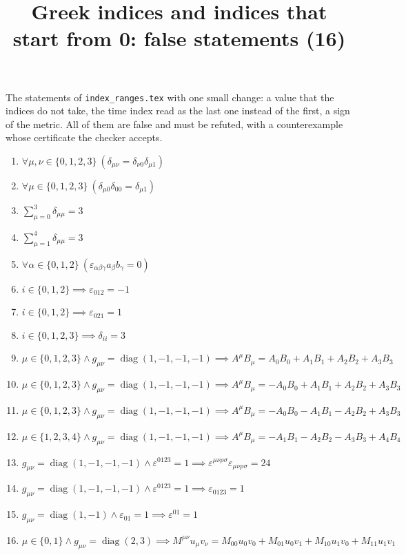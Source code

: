 \documentclass[11pt,a4paper]{article}
\title{Greek indices and indices that start from 0: false statements (16)}
\author{}
\date{}
\begin{document}
\maketitle
The statements of \texttt{index\_ranges.tex} with one small change: a value that the indices do not take, the time index read as the last one instead of the first, a sign of the metric. All of them are false and must be refuted, with a counterexample whose certificate the checker accepts.

\begin{enumerate}
\item $\displaystyle \forall \mu, \nu \in \{0, 1, 2, 3\}\ \left( \delta_{\mu\nu} = \delta_{\nu 0}\delta_{\mu 1} \right)$
\item $\displaystyle \forall \mu \in \{0, 1, 2, 3\}\ \left( \delta_{\mu 0}\delta_{00} = \delta_{\mu 1} \right)$
\item $\displaystyle \sum_{\mu=0}^{3} \delta_{\mu\mu} = 3$
\item $\displaystyle \sum_{\mu=1}^{4} \delta_{\mu\mu} = 3$
\item $\displaystyle \forall \alpha \in \{0, 1, 2\}\ \left( \varepsilon_{\alpha\beta\gamma} a_{\beta} b_{\gamma} = 0 \right)$
\item $\displaystyle i \in \{0, 1, 2\} \implies \varepsilon_{012} = -1$
\item $\displaystyle i \in \{0, 1, 2\} \implies \varepsilon_{021} = 1$
\item $\displaystyle i \in \{0, 1, 2, 3\} \implies \delta_{ii} = 3$
\item $\displaystyle \mu \in \{0, 1, 2, 3\} \land g_{\mu\nu} = \operatorname{diag}(1, -1, -1, -1) \implies A^{\mu} B_{\mu} = A_{0} B_{0} + A_{1} B_{1} + A_{2} B_{2} + A_{3} B_{3}$
\item $\displaystyle \mu \in \{0, 1, 2, 3\} \land g_{\mu\nu} = \operatorname{diag}(1, -1, -1, -1) \implies A^{\mu} B_{\mu} = -A_{0} B_{0} + A_{1} B_{1} + A_{2} B_{2} + A_{3} B_{3}$
\item $\displaystyle \mu \in \{0, 1, 2, 3\} \land g_{\mu\nu} = \operatorname{diag}(1, -1, -1, -1) \implies A^{\mu} B_{\mu} = -A_{0} B_{0} - A_{1} B_{1} - A_{2} B_{2} + A_{3} B_{3}$
\item $\displaystyle \mu \in \{1, 2, 3, 4\} \land g_{\mu\nu} = \operatorname{diag}(1, -1, -1, -1) \implies A^{\mu} B_{\mu} = -A_{1} B_{1} - A_{2} B_{2} - A_{3} B_{3} + A_{4} B_{4}$
\item $\displaystyle g_{\mu\nu} = \operatorname{diag}(1, -1, -1, -1) \land \varepsilon^{0123} = 1 \implies \varepsilon^{\mu\nu\rho\sigma}\varepsilon_{\mu\nu\rho\sigma} = 24$
\item $\displaystyle g_{\mu\nu} = \operatorname{diag}(1, -1, -1, -1) \land \varepsilon^{0123} = 1 \implies \varepsilon_{0123} = 1$
\item $\displaystyle g_{\mu\nu} = \operatorname{diag}(1, -1) \land \varepsilon_{01} = 1 \implies \varepsilon^{01} = 1$
\item $\displaystyle \mu \in \{0, 1\} \land g_{\mu\nu} = \operatorname{diag}(2, 3) \implies M^{\mu\nu} u_{\mu} v_{\nu} = M_{00} u_{0} v_{0} + M_{01} u_{0} v_{1} + M_{10} u_{1} v_{0} + M_{11} u_{1} v_{1}$
\end{enumerate}
\end{document}
